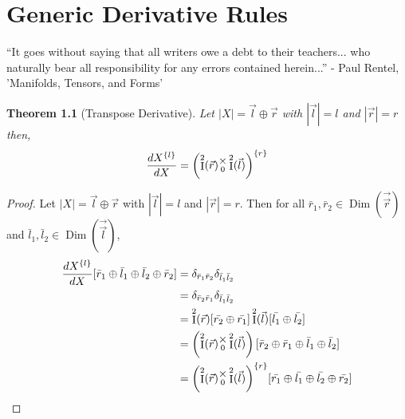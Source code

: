 \documentclass[12pt]{book}
\theoremstyle{plain}
\newtheorem{theorem}{Theorem}[chapter]
\theoremstyle{definition}
\theoremstyle{ppart}
\theoremstyle{case}
\theoremstyle{solution}
\DeclareMathOperator{\Dim}{Dim}
\DeclareMathOperator{\Ident}{I}
\newcommand{\mmult}[1]{\text{\raisebox{1ex}{$\underset{#1}{\times}$}}}
\newcommand{\shape}[1]{\left|#1\right|}
\newcommand{\transpose}[2]{{#1}^{\{#2\}}}
\begin{document}
\chapter{Generic Derivative Rules}

\begin{displayquote}
``It goes without saying that all writers owe a debt to their teachers... who
naturally bear all responsibility for any errors contained herein...''
- Paul Rentel, 'Manifolds, Tensors, and Forms'
\end{displayquote}

\begin{theorem}[Transpose Derivative]
\label{tran_derivative}
Let $\shape{X} = \vec{l} \oplus \vec{r}$ with $\shape{\vec{l}} = l$ and $\shape{\vec{r}} = r$ then,
\[
 \frac{d\transpose{X}{l}}{dX} =
 \transpose{\left(\Ident^2(\vec{r}) \mmult{0} \Ident^2(\vec{l})\right)}{r}
\]
\end{theorem}
\begin{proof}
Let $\shape{X} = \vec{l} \oplus \vec{r}$ with $\shape{\vec{l}} = l$ and $\shape{\vec{r}} = r$.
Then for all $\bar{r}_1, \bar{r}_2 \in \Dim(\vec{\vec{r}})$ and $\bar{l}_1, \bar{l}_2 \in \Dim(\vec{\vec{l}})$,
\begin{align*}
 \frac{d\transpose{X}{l}}{dX}
 [\bar{r}_1 \oplus \bar{l}_1 \oplus \bar{l}_2 \oplus \bar{r}_2]
 &= \delta_{\bar{r}_1\bar{r}_2} \delta_{\bar{l}_1\bar{l}_2} \\
 &= \delta_{\bar{r}_2\bar{r}_1} \delta_{\bar{l}_1\bar{l}_2} \\
 &=
  \Ident^2(\vec{r})[\bar{r_2}\oplus\bar{r_1}]
  \Ident^2(\vec{l})[\bar{l_1}\oplus\bar{l_2}] \\
 &=
   \left(
    \Ident^2(\vec{r})
    \mmult{0}
    \Ident^2(\vec{l})
  \right)
  [\bar{r}_2 \oplus \bar{r}_1 \oplus \bar{l}_1 \oplus \bar{l}_2] \\
 &=
  \transpose{\left(
    \Ident^2(\vec{r})
    \mmult{0}
    \Ident^2(\vec{l})
  \right)}{r}
  [\bar{r_1} \oplus \bar{l_1} \oplus \bar{l_2} \oplus \bar{r_2}]
\end{align*}
\end{proof}
\end{document}
